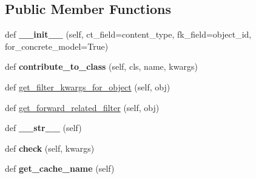 \subsection*{Public Member Functions}
\begin{DoxyCompactItemize}
\item 
\mbox{\label{classdjango_1_1contrib_1_1contenttypes_1_1fields_1_1_generic_foreign_key_ac7a7be6e5339b215e95e23e3ab7e200f}} 
def {\bfseries \+\_\+\+\_\+init\+\_\+\+\_\+} (self, ct\+\_\+field=\textquotesingle{}content\+\_\+type\textquotesingle{}, fk\+\_\+field=\textquotesingle{}object\+\_\+id\textquotesingle{}, for\+\_\+concrete\+\_\+model=True)
\item 
\mbox{\label{classdjango_1_1contrib_1_1contenttypes_1_1fields_1_1_generic_foreign_key_a3019758ca4fa0eae9ccff4328195eba8}} 
def {\bfseries contribute\+\_\+to\+\_\+class} (self, cls, name, kwargs)
\item 
def \mbox{\hyperlink{classdjango_1_1contrib_1_1contenttypes_1_1fields_1_1_generic_foreign_key_aeb9dccb22042ee9959d62a1e46649ce4}{get\+\_\+filter\+\_\+kwargs\+\_\+for\+\_\+object}} (self, obj)
\item 
def \mbox{\hyperlink{classdjango_1_1contrib_1_1contenttypes_1_1fields_1_1_generic_foreign_key_a069c7e75f0ca299ecb544ee9d642d47a}{get\+\_\+forward\+\_\+related\+\_\+filter}} (self, obj)
\item 
\mbox{\label{classdjango_1_1contrib_1_1contenttypes_1_1fields_1_1_generic_foreign_key_a8a76650153343660900f46950cb1fe77}} 
def {\bfseries \+\_\+\+\_\+str\+\_\+\+\_\+} (self)
\item 
\mbox{\label{classdjango_1_1contrib_1_1contenttypes_1_1fields_1_1_generic_foreign_key_a18dde50a8cbd3ad17dcc264812537fe1}} 
def {\bfseries check} (self, kwargs)
\item 
\mbox{\label{classdjango_1_1contrib_1_1contenttypes_1_1fields_1_1_generic_foreign_key_a8c6b83275164a0efcdb39a5f0141ddf3}} 
def {\bfseries get\+\_\+cache\+\_\+name} (self)

\end{DoxyCompactItemize}
